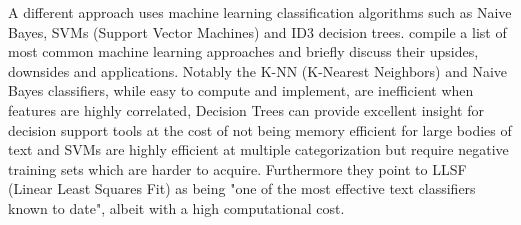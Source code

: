 \documentclass{article}
\begin{document}
	A different approach uses machine learning classification algorithms such as Naive Bayes, SVMs (Support Vector Machines) and ID3 decision trees. \textcite{korde} compile a list of most common machine learning approaches and briefly discuss their upsides, downsides and applications. Notably the K-NN (K-Nearest Neighbors) and Naive Bayes classifiers, while easy to compute and implement, are inefficient when features are highly correlated, Decision Trees can provide excellent insight for decision support tools at the cost of not being memory efficient for large bodies of text and SVMs are highly efficient at multiple categorization but require negative training sets which are harder to acquire. Furthermore they point to LLSF (Linear Least Squares Fit) as being "one of the most effective text classifiers known to date", albeit with a high computational cost.\par
	
	
	
	\printbibliography
	
\end{document}
